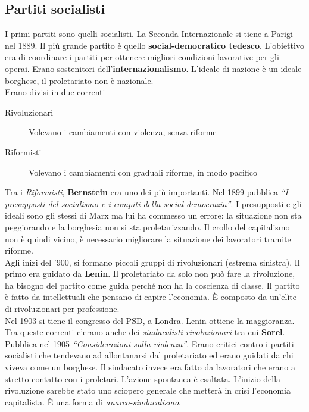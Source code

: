 \subsection{Partiti socialisti}
I primi partiti sono quelli socialisti. La Seconda Internazionale si tiene a Parigi
nel 1889. Il più grande partito è quello \textbf{social-democratico tedesco}. L'obiettivo era di
coordinare i partiti per ottenere migliori condizioni lavorative per gli operai. Erano sostenitori
dell'\textbf{internazionalismo}. L'ideale di nazione è un ideale borghese, il proletariato non è
nazionale.\\ [\baselineskip]
Erano divisi in due correnti
\begin{description}
  \item[Rivoluzionari] Volevano i cambiamenti con violenza, senza riforme
  \item[Riformisti] Volevano i cambiamenti con graduali riforme, in modo pacifico
\end{description}
Tra i \emph{Riformisti}, \textbf{Bernstein} era uno dei più importanti. Nel 1899 pubblica 
\emph{``I presupposti del socialismo e i compiti della social-democrazia''}. I presupposti e gli 
ideali sono gli stessi di Marx ma lui ha commesso un errore: la situazione non sta peggiorando e la 
borghesia non si sta proletarizzando. Il crollo del capitalismo non è quindi vicino, è necessario 
migliorare la situazione dei lavoratori tramite riforme.\\ [\baselineskip]
Agli inizi del '900, si formano piccoli gruppi di rivoluzionari (estrema sinistra). Il primo era
guidato da \textbf{Lenin}. Il proletariato da solo non può fare la rivoluzione, ha bisogno del
partito come guida perché non ha la coscienza di classe. Il partito è fatto da intellettuali che
pensano di capire l'economia. È composto da un'elìte di rivoluzionari per professione.\\ 
[\baselineskip]
Nel 1903 si tiene il congresso del PSD, a Londra. Lenin ottiene la maggioranza. Tra queste correnti
c'erano anche dei \emph{sindacalisti rivoluzionari} tra cui \textbf{Sorel}. Pubblica nel 1905
\emph{``Considerazioni sulla violenza''}. Erano critici contro i partiti socialisti che tendevano ad
allontanarsi dal proletariato ed erano guidati da chi viveva come un borghese. Il sindacato invece
era fatto da lavoratori che erano a stretto contatto con i proletari. L'azione spontanea è esaltata.
L'inizio della rivoluzione sarebbe stato uno sciopero generale che metterà in crisi l'economia
capitalista. È una forma di \emph{anarco-sindacalismo}.

